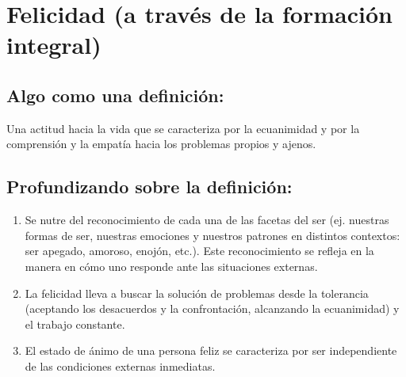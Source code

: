\documentclass[10pt,letterpaper]{book}
\begin{document}
	\section{Felicidad (a través de la formación integral)} 

		\subsection{Algo como una definición:}
		Una actitud hacia la vida que se caracteriza por la ecuanimidad y por la comprensión y la empatía hacia los problemas propios y ajenos.
		\subsection{Profundizando sobre la definición:} 
		\begin{enumerate}[label=\alph*]
		\item Se nutre del reconocimiento de cada una de las facetas del ser (ej. nuestras formas de ser, nuestras emociones y nuestros patrones en distintos contextos: ser apegado, amoroso, enojón, etc.). Este reconocimiento se refleja en la manera en cómo uno responde ante las situaciones externas.
\item La felicidad lleva a buscar la solución de problemas desde la tolerancia (aceptando los desacuerdos y la confrontación, alcanzando la ecuanimidad)  y el trabajo constante.
\item El estado de ánimo de una persona feliz se caracteriza por ser independiente de las condiciones externas inmediatas.
		\end{enumerate}
\end{document}

